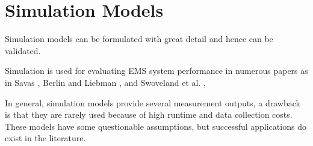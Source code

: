 \section{Simulation Models}
Simulation models
can be formulated with great detail
and hence can be validated.

Simulation
is used for evaluating EMS system performance in numerous papers
as in Savas \cite{savas1969simulation},
Berlin and Liebman \cite{berlin1974mathematical},
and Swoveland et al. \cite{swoveland1973simulation},

In general,
simulation models provide
several measurement outputs,
a drawback is that
they are rarely used
because of high runtime and data collection costs.
These models have some questionable assumptions,
but successful applications do exist in the literature.
